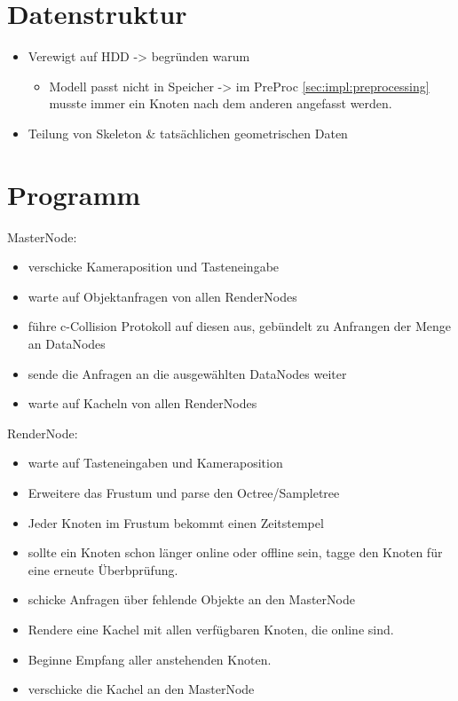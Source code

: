 \section{Datenstruktur}
\label{sec:impl:datenstruktur}
%
\begin{itemize}
 \item Verewigt auf HDD -> begründen warum
 \begin{itemize}
  \item Modell passt nicht in Speicher -> im PreProc \ref{sec:impl:preprocessing} musste immer ein Knoten nach dem anderen angefasst werden.
 \end{itemize}

 \item Teilung von Skeleton \& tatsächlichen geometrischen Daten
\end{itemize}

\section{Programm}
\label{sec:impl:program}
\label{masternode}
MasterNode:
\begin{itemize}
 \item verschicke Kameraposition und Tasteneingabe
 \item warte auf Objektanfragen von allen RenderNodes
 \item führe c-Collision Protokoll auf diesen aus, gebündelt zu Anfrangen der Menge an DataNodes
 \item sende die Anfragen an die ausgewählten DataNodes weiter
 \item warte auf Kacheln von allen RenderNodes
\end{itemize}

\label{rendernode}
RenderNode:
\begin{itemize}
 \item warte auf Tasteneingaben und Kameraposition
 \item Erweitere das Frustum und parse den Octree/Sampletree
 \item Jeder Knoten im Frustum bekommt einen Zeitstempel
 \item sollte ein Knoten schon länger online oder offline sein, tagge den Knoten für eine erneute Überbprüfung.
 \item schicke Anfragen über fehlende Objekte an den MasterNode
 \item Rendere eine Kachel mit allen verfügbaren Knoten, die online sind.
 \item Beginne Empfang aller anstehenden Knoten.
 \item verschicke die Kachel an den MasterNode
\end{itemize}

